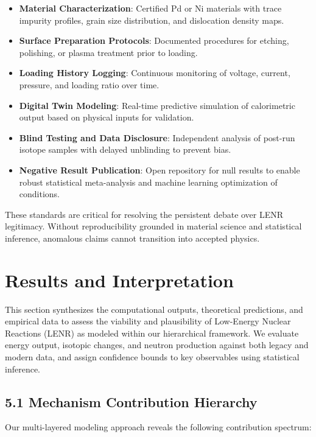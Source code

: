     \begin{itemize}
        \item \textbf{Material Characterization}: Certified Pd or Ni materials with trace impurity profiles, grain size distribution, and dislocation density maps.
        \item \textbf{Surface Preparation Protocols}: Documented procedures for etching, polishing, or plasma treatment prior to loading.
        \item \textbf{Loading History Logging}: Continuous monitoring of voltage, current, pressure, and loading ratio over time.
        \item \textbf{Digital Twin Modeling}: Real-time predictive simulation of calorimetric output based on physical inputs for validation.
        \item \textbf{Blind Testing and Data Disclosure}: Independent analysis of post-run isotope samples with delayed unblinding to prevent bias.
        \item \textbf{Negative Result Publication}: Open repository for null results to enable robust statistical meta-analysis and machine learning optimization of conditions.
    \end{itemize}
    
    These standards are critical for resolving the persistent debate over LENR legitimacy. Without reproducibility grounded in material science and statistical inference, anomalous claims cannot transition into accepted physics.
    
    \section{Results and Interpretation}
    
    This section synthesizes the computational outputs, theoretical predictions, and empirical data to assess the viability and plausibility of Low-Energy Nuclear Reactions (LENR) as modeled within our hierarchical framework. We evaluate energy output, isotopic changes, and neutron production against both legacy and modern data, and assign confidence bounds to key observables using statistical inference.
    
    \subsection{5.1 Mechanism Contribution Hierarchy}
    
    Our multi-layered modeling approach reveals the following contribution spectrum:
    
